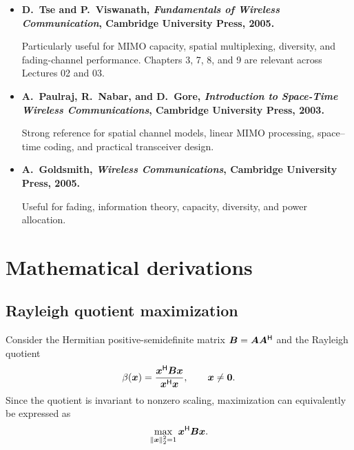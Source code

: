 \begin{itemize}
	\item\textbf{D.~Tse and P.~Viswanath,
		\emph{Fundamentals of Wireless Communication},
		Cambridge University Press, 2005.}
	
	Particularly useful for MIMO capacity, spatial multiplexing, diversity, and fading-channel performance. Chapters 3, 7, 8, and 9 are relevant across Lectures 02 and 03.
	
	\item \textbf{A.~Paulraj, R.~Nabar, and D.~Gore,
		\emph{Introduction to Space-Time Wireless Communications},
		Cambridge University Press, 2003.}
	
	Strong reference for spatial channel models, linear MIMO processing, space–time coding, and practical transceiver design.
	
	\item\textbf{ A.~Goldsmith,
		\emph{Wireless Communications},
		Cambridge University Press, 2005.}
	
	Useful for fading, information theory, capacity, diversity, and power allocation.
\end{itemize}


\section{Mathematical derivations}

\subsection{Rayleigh quotient maximization}
\label{app:rayleigh}

Consider the Hermitian positive-semidefinite matrix
$\bm{B}=\bm{A}{\bm{A}}^{\mathsf{H}}$ and the Rayleigh quotient
\begin{equation*}
	\beta(\bm{x})
	=\frac{{\bm{x}}^{\mathsf{H}}\bm{B}\bm{x}}
	{{\bm{x}}^{\mathsf{H}}\bm{x}},
	\qquad \bm{x}\neq\bm{0}.
\end{equation*}
Since the quotient is invariant to nonzero scaling,
maximization can equivalently be expressed as
\begin{equation}\label{eq:app-rayleigh-opt}
	\max_{\left\|\bm{x}\right\|_2^2=1}
	{\bm{x}}^{\mathsf{H}}\bm{B}\bm{x}.
\end{equation}

